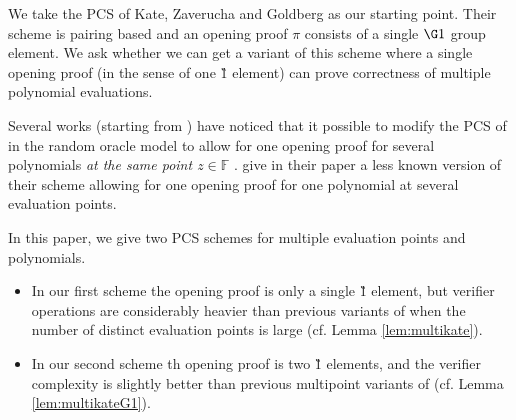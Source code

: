 \documentclass[11pt]{article} %
\newcommand{\F}{\ensuremath{\mathbb F}\xspace}
\begin{document}
We take the PCS of Kate, Zaverucha and Goldberg \cite{kate} as our starting point. Their scheme is pairing based and an opening proof $\pi$ consists of a single $\G1$ group element. We ask whether we can get a variant of this scheme where a single opening proof (in the sense of one \G1 element) can prove correctness of multiple polynomial evaluations.

Several works \cite{sonic,auroralight,marlin,plonk} (starting from \cite{sonic}) have noticed that it possible to modify the PCS of \cite{kate} in the random oracle model to allow for one opening proof for several polynomials \emph{at the same point $z\in \F$} .
\cite{kate} give in their paper a less known version of their scheme allowing for one opening proof for one polynomial at several evaluation points.



In this paper, we give two PCS schemes for multiple evaluation points and polynomials.
\begin{itemize}
 \item In our first scheme the opening proof is only a single \G1 element, but verifier operations are considerably heavier than previous variants of \cite{kate} when the number of distinct evaluation points is large (cf. Lemma \ref{lem:multikate}).
\item In our second scheme th opening proof is two \G1 elements, and the verifier complexity is slightly better than previous multipoint variants of \cite{kate} (cf. Lemma \ref{lem:multikateG1}).
 \end{itemize}
\end{document}
